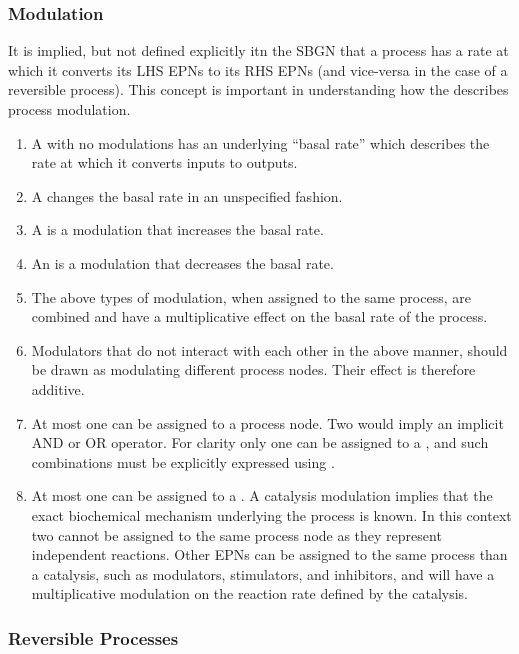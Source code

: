 \subsubsection{Modulation}
\label{sec:mod-semantics}

It is implied, but not defined explicitly itn the SBGN \PDl that a process has a rate at
which it converts its LHS EPNs to its RHS EPNs (and vice-versa in the case of a reversible process). This concept is
important in understanding how the \PDl describes process modulation.

\begin{enumerate}
\item A  with no modulations has an underlying ``basal rate''
  which describes the rate at which it converts inputs to outputs.
\item A  changes the basal rate in an unspecified fashion.
\item A  is a modulation that increases the basal rate.
\item An  is a modulation that decreases the basal rate.
\item The above types of modulation, when assigned to the same process, are combined and have a multiplicative effect on the basal rate of the process.
\item Modulators that do not interact with each other in the above manner, should be drawn as modulating different process nodes. Their effect is therefore additive.
\item At most one  can be assigned to a process node. Two 
  would imply an implicit AND or OR operator. For clarity only
  one  can be assigned to a , and such combinations must be
  explicitly expressed using .
\item At most one  can be assigned to a . A catalysis
  modulation implies that the exact biochemical mechanism underlying
  the process is known. In this context two  cannot
  be assigned to the same process node as they represent
  independent reactions. Other EPNs can be
  assigned to the same process than a catalysis, such as modulators, stimulators, and
  inhibitors, and will have a multiplicative modulation on the reaction
  rate defined by the catalysis.
\end{enumerate}

\subsubsection{Reversible Processes}
\label{sec: semantics reversible procs}

